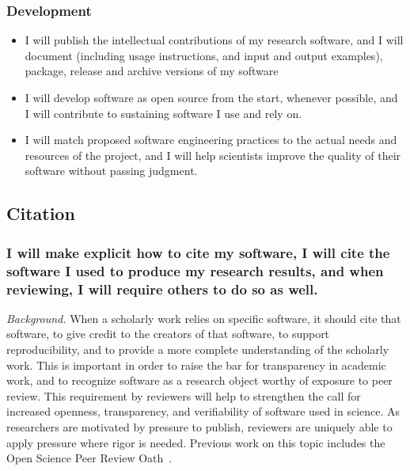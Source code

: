 \documentclass[a4paper,UKenglish]{dagman}
\renewcommand{\paragraph}[1]{\subsubsection*{#1}\xspace}
\begin{document}
\paragraph{Development}
\begin{itemize}
\item I will publish the intellectual contributions of my research software, and
I will document (including usage instructions, and input and output examples), package, release and archive versions of my software
\item I will develop software as open source from the start, whenever possible, and I will contribute to sustaining software I use and rely on.
\item I will match proposed software engineering practices to the actual needs and resources of the project, and I will help scientists improve the quality of their software without passing judgment.
\end{itemize}

\subsection{Citation}



\paragraph{I will make explicit how to cite my software, I will cite the software I used to produce my research results, and when reviewing, I will require others to do so as well.}

\emph{Background.} When a scholarly work relies on specific software, it should cite that software, to give credit to the creators of that software, to support reproducibility, and to provide a more complete understanding of the scholarly work.
This is important in order to raise the bar for transparency in academic work, and to recognize software as a research object worthy of exposure to peer review. This requirement by reviewers will help to strengthen the call for increased openness, transparency, and verifiability of software used in science. As researchers are motivated by pressure to publish, reviewers are uniquely able to apply pressure where rigor is needed. Previous work on this topic includes the Open Science Peer Review Oath~\cite{aleksic_open_2015}.
\end{document}
